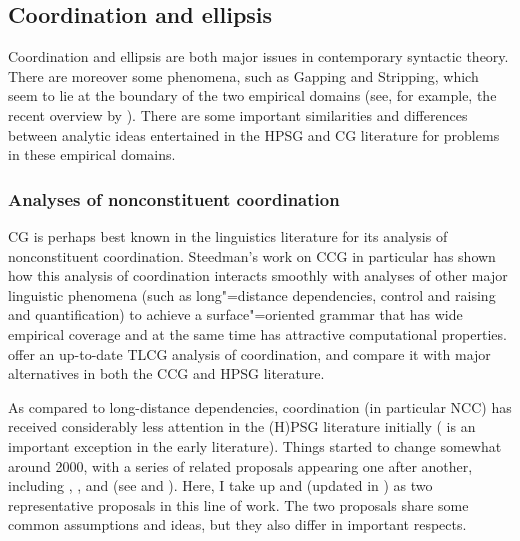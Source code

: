 \documentclass[output=paper
                ,modfonts
 	        ,biblatex
                ,babelshorthands
                ,newtxmath
                ,draftmode
                ,colorlinks, citecolor=brown
]{langscibook}
\begin{document}
\subsection{Coordination and ellipsis}

Coordination and ellipsis are both major issues in contemporary
syntactic theory. There are moreover some phenomena, such as Gapping
and Stripping, which seem to lie at the boundary of the two
empirical domains (see,  for example,  the recent overview
by \citealt{johnson-ellipsis-handbook}). There are some important similarities and
differences between analytic ideas entertained in the HPSG and CG
literature for problems in these empirical domains.


\subsubsection{Analyses of nonconstituent coordination  \label{NCCcomparison}}

CG is perhaps best known in the linguistics literature for its
analysis of nonconstituent coordination. Steedman's work on CCG
\citep{Steedman97a,Steedman2000a-u,steedman2012} in particular has
shown how this analysis of coordination interacts smoothly with
analyses of other major linguistic phenomena (such as long"=distance
dependencies, control and raising and quantification) to achieve a
surface"=oriented grammar that has wide empirical coverage and at the
same time has attractive computational properties.
\citet{kubota-levine-coord,KubotaLevineBook} offer an up-to-date TLCG
analysis of coordination, and compare it with major alternatives in
both the CCG and HPSG literature.


As compared to long-distance dependencies, coordination (in particular
NCC) has received considerably less attention in the (H)PSG literature
initially (\citealt{sgww} is an important exception in the early
literature). Things started to change somewhat around 2000, with a
series of related proposals appearing one after another, including
\citet{Yatabe2001a}, \citet{BS2004a}, \citet{chaves07} and
\citet{Crysmann2003c} (see
 and ). Here, I take up
\citet{BS2004a} and \citet{Yatabe2001a} (updated in
\citealt{yatabe-tam2017}) as two representative proposals in this line
of work. The two proposals share some common assumptions and ideas,
but they also differ in important respects.
\end{document}
